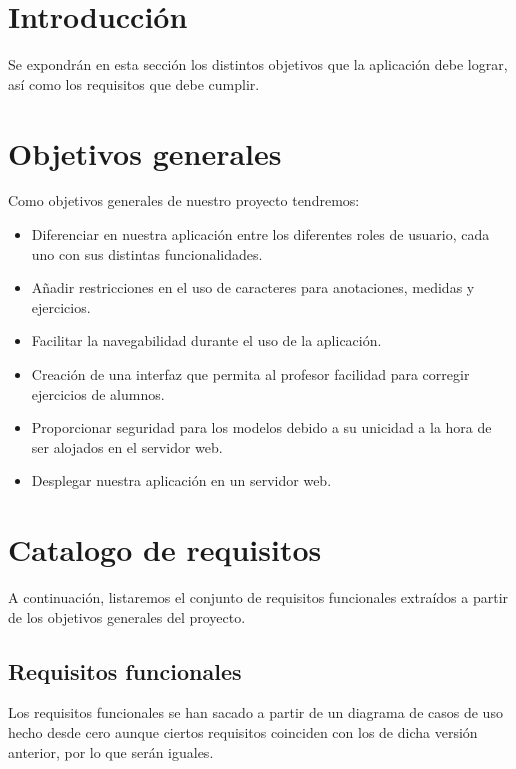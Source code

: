 
\section{Introducción}
Se expondrán en esta sección los distintos objetivos que la aplicación debe lograr, así como los requisitos que debe cumplir.

\section{Objetivos generales}
Como objetivos generales de nuestro proyecto tendremos:
\begin{itemize}
	\item Diferenciar en nuestra aplicación entre los diferentes roles de usuario, cada uno con sus distintas funcionalidades.
	\item Añadir restricciones en el uso de caracteres para anotaciones, medidas y ejercicios.
	\item Facilitar la navegabilidad durante el uso de la aplicación.
	\item Creación de una interfaz que permita al profesor facilidad para corregir ejercicios de alumnos.
	\item Proporcionar seguridad para los modelos debido a su unicidad a la hora de ser alojados en el servidor web.
	\item Desplegar nuestra aplicación en un servidor web.
\end{itemize}

\section{Catalogo de requisitos}
A continuación, listaremos el conjunto de requisitos funcionales extraídos a partir de los objetivos generales del proyecto.

\subsection{Requisitos funcionales}
Los requisitos funcionales se han sacado a partir de un diagrama de casos de uso hecho desde cero aunque ciertos requisitos coinciden con los de dicha versión anterior, por lo que serán iguales.

